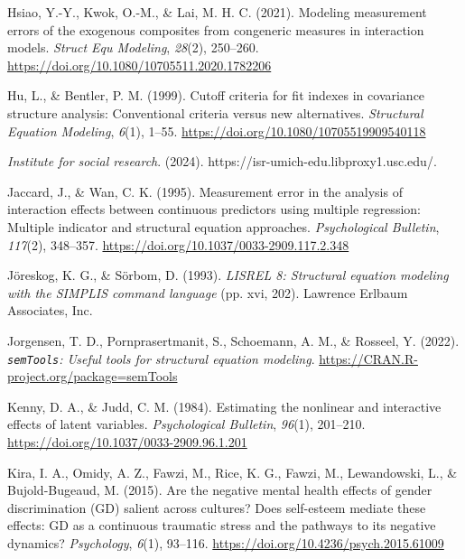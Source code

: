 \documentclass[
  man]{apa7}
\newlength{\cslhangindent}
\newlength{\cslentryspacingunit} %
\newenvironment{CSLReferences}[2] %
 {%
  \setlength{\parindent}{0pt}
  \ifodd #1
  \let\oldpar\par
  \def\par{\hangindent=\cslhangindent\oldpar}
  \fi
  \setlength{\parskip}{#2\cslentryspacingunit}
 }%
 {}
\begin{document}
\begin{CSLReferences}{1}{0}
\leavevmode{}%
Hsiao, Y.-Y., Kwok, O.-M., \& Lai, M. H. C. (2021). Modeling measurement errors of the exogenous composites from congeneric measures in interaction models. \emph{Struct Equ Modeling}, \emph{28}(2), 250--260. \url{https://doi.org/10.1080/10705511.2020.1782206}

\leavevmode{}%
Hu, L., \& Bentler, P. M. (1999). Cutoff criteria for fit indexes in covariance structure analysis: {Conventional} criteria versus new alternatives. \emph{Structural Equation Modeling}, \emph{6}(1), 1--55. \url{https://doi.org/10.1080/10705519909540118}

\leavevmode{}%
\emph{Institute for social research}. (2024). https://isr-umich-edu.libproxy1.usc.edu/.

\leavevmode{}%
Jaccard, J., \& Wan, C. K. (1995). Measurement error in the analysis of interaction effects between continuous predictors using multiple regression: {Multiple} indicator and structural equation approaches. \emph{Psychological Bulletin}, \emph{117}(2), 348--357. \url{https://doi.org/10.1037/0033-2909.117.2.348}

\leavevmode{}%
Jöreskog, K. G., \& Sörbom, D. (1993). \emph{{LISREL} 8: {Structural} equation modeling with the {SIMPLIS} command language} (pp. xvi, 202). Lawrence Erlbaum Associates, Inc.

\leavevmode{}%
Jorgensen, T. D., Pornprasertmanit, S., Schoemann, A. M., \& Rosseel, Y. (2022). \emph{\texttt{semTools}: {U}seful tools for structural equation modeling}. \url{https://CRAN.R-project.org/package=semTools}

\leavevmode{}%
Kenny, D. A., \& Judd, C. M. (1984). Estimating the nonlinear and interactive effects of latent variables. \emph{Psychological Bulletin}, \emph{96}(1), 201--210. \url{https://doi.org/10.1037/0033-2909.96.1.201}

\leavevmode{}%
Kira, I. A., Omidy, A. Z., Fawzi, M., Rice, K. G., Fawzi, M., Lewandowski, L., \& Bujold-Bugeaud, M. (2015). Are the negative mental health effects of gender discrimination ({GD}) salient across cultures? {Does} self-esteem mediate these effects: {GD} as a continuous traumatic stress and the pathways to its negative dynamics? \emph{Psychology}, \emph{6}(1), 93--116. \url{https://doi.org/10.4236/psych.2015.61009}


\end{CSLReferences}
\end{document}
